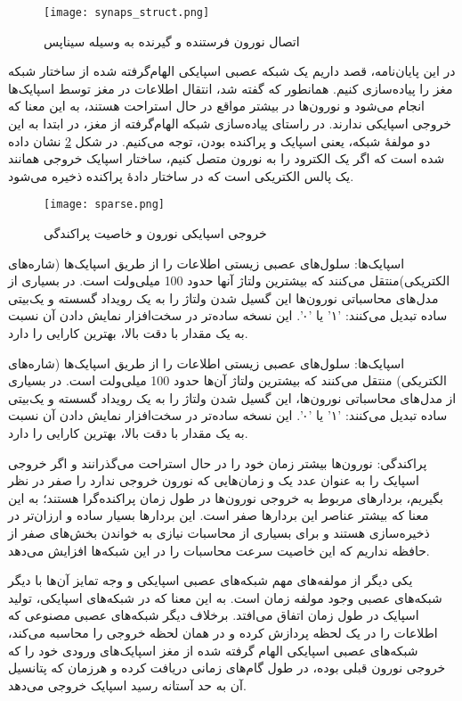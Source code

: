   \begin{figure}[htbp]
 	\centering
 	\texttt{[image: synaps\_struct.png]}
 	\caption{اتصال نورون فرستنده و گیرنده به وسیله سیناپس}
 	\label{fig:neuron2}
 \end{figure}
 
 
در این پایان‌نامه، قصد داریم یک شبکه عصبی اسپایکی الهام‌گرفته شده از ساختار شبکه مغز را پیاده‌سازی کنیم. همانطور که گفته شد، انتقال اطلاعات در مغز توسط اسپایک‌ها انجام می‌شود و نورون‌ها در بیشتر مواقع در حال استراحت هستند، به این معنا که خروجی اسپایکی ندارند. در راستای پیاده‌سازی شبکه الهام‌گرفته از مغز، در ابتدا به این دو مولفهٔ شبکه، یعنی اسپایک و پراکنده بودن، توجه می‌کنیم. در شکل \ref{fig:neuron3} نشان داده شده است که اگر یک الکترود را به نورون متصل کنیم، ساختار اسپایک خروجی همانند یک پالس الکتریکی است که در ساختار دادهٔ پراکنده ذخیره می‌شود.  \citep{wu2020training}
 \begin{figure}[htbp]
 	\centering
 	\texttt{[image: sparse.png]}
 	\caption{خروجی اسپایکی نورون و خاصیت پراکندگی}
 	\label{fig:neuron3}
 \end{figure}
 
  اسپایک‌ها: سلول‌های عصبی زیستی اطلاعات را از طریق اسپایک‌ها (شاره‌های الکتریکی)منتقل می‌کنند که بیشترین ولتاژ  آنها حدود 100 میلی‌ولت است. در بسیاری از مدل‌های محاسباتی نورون‌ها این گسیل شدن ولتاژ را به یک رویداد گسسته و یک‌بیتی ساده تبدیل می‌کنند: '۱' یا '۰'. این نسخه ساده‌تر در سخت‌افزار نمایش دادن آن نسبت به یک مقدار با دقت بالا، بهترین کارایی را دارد.
  
  اسپایک‌ها: سلول‌های عصبی زیستی اطلاعات را از طریق اسپایک‌ها (شاره‌های الکتریکی) منتقل می‌کنند که بیشترین ولتاژ آن‌ها حدود 100 میلی‌ولت است. در بسیاری از مدل‌های محاسباتی نورون‌ها، این گسیل شدن ولتاژ را به یک رویداد گسسته و یک‌بیتی ساده تبدیل می‌کنند: '۱' یا '۰'. این نسخه ساده‌تر در سخت‌افزار نمایش دادن آن نسبت به یک مقدار با دقت بالا، بهترین کارایی را دارد.
  
  پراکندگی: نورون‌ها بیشتر زمان خود را در حال استراحت می‌گذرانند و اگر خروجی اسپایک را به عنوان عدد یک و زمان‌هایی که نورون خروجی ندارد را صفر در نظر بگیریم، بردارهای مربوط به خروجی نورون‌ها در طول زمان پراکنده‌گرا هستند؛ به این معنا که بیشتر عناصر این بردارها صفر است. این بردارها بسیار ساده و ارزان‌تر در ذخیره‌سازی هستند و برای بسیاری از محاسبات نیازی به خواندن بخش‌های صفر از حافظه نداریم که این خاصیت سرعت محاسبات را در این شبکه‌ها افزایش می‌دهد.
  
 یکی دیگر از مولفه‌های مهم شبکه‌های عصبی اسپایکی و وجه تمایز آن‌ها با دیگر شبکه‌های عصبی وجود مولفه زمان است. به این معنا که در شبکه‌های اسپایکی، تولید اسپایک در طول زمان اتفاق می‌افتد. برخلاف دیگر شبکه‌های عصبی مصنوعی که اطلاعات را در یک لحظه پردازش کرده و در همان لحظه خروجی را محاسبه می‌کند، شبکه‌های عصبی اسپایکی الهام گرفته شده از مغز اسپایک‌های ورودی خود را که خروجی نورون قبلی بوده، در طول گام‌های زمانی دریافت کرده و  هرزمان که پتانسیل آن به حد آستانه رسید اسپایک خروجی می‌د‌هد.
 
